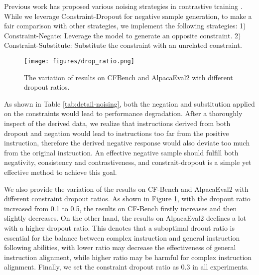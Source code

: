 Previous work has proposed various noising strategies in contrastive training \cite{lai-etal-2021-saliency-based}. While we leverage Constraint-Dropout for negative sample generation, to make a fair comparison with other strategies, we implement the following strategies: 1) Constraint-Negate: Leverage the model to generate an opposite constraint. 2) Constraint-Substitute: Substitute the constraint with an unrelated constraint.

\begin{figure}[h]
\centering
\texttt{[image: figures/drop\_ratio.png]}
\caption{The variation of results on CFBench and AlpacaEval2 with different dropout ratios.}
\label{fig:drop_ratio}
\end{figure}

As shown in Table \ref{tab:detail-noising}, both the negation and substitution applied on the constraints would lead to performance degradation. After a thoroughly inspect of the derived data, we realize that instructions derived from both dropout and negation would lead to instructions too far from the positive instruction, therefore the derived negative response would also deviate too much from the original instruction. An effective negative sample should fulfill both negativity, consistency and contrastiveness, and constrait-dropout is a simple yet effective method to achieve this goal.

We also provide the variation of the results on CF-Bench and AlpacaEval2 with different constraint dropout ratios. As shown in Figure \ref{fig:drop_ratio}, with the dropout ratio increased from 0.1 to 0.5, the results on CF-Bench firstly increases and then slightly decreases. On the other hand, the results on AlpacaEval2 declines a lot with a higher dropout ratio. This denotes that a suboptimal droout ratio is essential for the balance between complex instruction and general instruction following abilities, with lower ratio may decrease the effectiveness of general instruction alignment, while higher ratio may be harmful for complex instruction alignment. Finally, we set the constraint dropout ratio as 0.3 in all experiments.

